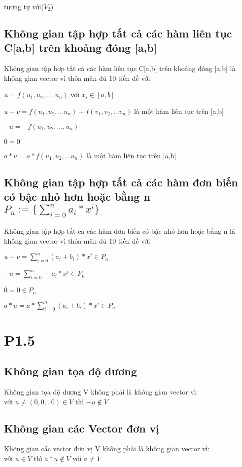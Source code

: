 \documentclass[a4paper,11pt]{article}
\theoremstyle{mytheor}
\begin{document}
tương tự với($V_2$)

\subsection*{Không gian tập hợp tất cả các hàm liên tục C[a,b] trên khoảng đóng [a,b]}
Không gian tập hợp tất cả các hàm liên tục C[a,b] trên khoảng đóng [a,b] là không gian vector vì thỏa mãn đủ 10 tiền đề với

    $u = f(u_1,u_2,..., u_n)$ với $x_i \in [a,b]$
    
    $u+v = f(u_1,u_2,... u_n) + f(v_1,v_2,... v_n)$  là một hàm liên tục trên [a,b]
    
    $-u = -f(u_1,u_2,..., u_n)$
    
    $\overline{0} = 0$
    
    $a*u = a*f(u_1,u_2,... u_n)$ là một hàm liên tục trên [a,b]
    
\subsection*{Không gian tập hợp tất cả các hàm đơn biến có bậc nhỏ hơn hoặc bằng n\\ $ P_n := \{ \sum\limits_{i=0}^n a_i*x^i \}$  }
Không gian tập hợp tất cả các hàm đơn biến có bậc nhỏ hơn hoặc bằng n là không gian vector vì thỏa mãn đủ 10 tiền đề với
    
    $u+v =  \sum\limits_{i=0}^n (a_i+b_i)*x^i  \in P_n$ 
    
    $-u = \sum\limits_{i=0}^n -a_i*x^i  \in P_n$
    
    $\overline{0} = 0 \in P_n$
    
    $a*u = a*\sum\limits_{i=0}^n (a_i+b_i)*x^i  \in P_n$
    
\section*{P1.5}
\subsection*{Không gian tọa độ dương}
Không gian tọa độ dương V không phải là không gian vector vì:\\
với $u \ne (0,0,..0) \in  V$ thì $-u \notin V$
\subsection*{Không gian các Vector đơn vị}
Không gian các vector đơn vị V không phải là không gian vector vì:\\
với $u \in V$ thì $a*u \notin V$ với $a \ne 1$
\end{document}

